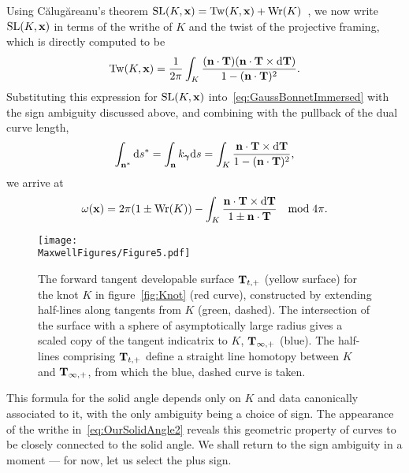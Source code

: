     Using C\u{a}lug\u{a}reanu's theorem $\mathrm{SL}(K,{\bf x}) = \mathrm{Tw}(K,{\bf x}) +\mathrm{Wr}(K)$~\citep{Calugareanu1959,Calugareanu1961}, we now write $ \mathrm{SL}(K,{\bf x})$ in terms of the writhe of $K$ and the twist of the projective framing, which is directly computed to be 
    \begin{equation}
        \mathrm{Tw}(K,{\bf x}) = \frac{1}{2\pi}\int_K  \frac{ ( {\bf n} \cdot {\bf T} ) ({\bf n} \cdot {\bf T} \times \mathrm{d}{\bf T}) }{1 - ({\bf n} \cdot {\bf T})^2} . 
        \label{eq:Twist}
    \end{equation}
    Substituting this expression for $\mathrm{SL}(K,{\bf x})$ into~\eqref{eq:GaussBonnetImmersed} with the sign ambiguity discussed above, and combining with the pullback of the dual curve length,
    \begin{equation}
        \int_{{\bf n ^*}} \mathrm{d} s^* = \int_{{\bf n}} k_{\bf \boldsymbol \gamma } \mathrm{d} s = \int_K  \frac{ {\bf n} \cdot {\bf T} \times \mathrm{d}{\bf T} }{1 - ({\bf n} \cdot {\bf T})^2},
        \label{eq:geodesicpullback1}
    \end{equation}
    we arrive at
    \begin{equation}
        \omega({\bf x}) = 2 \pi(1 \pm \mathrm{Wr}(K)) - \int_K  \frac{ {\bf n} \cdot {\bf T} \times \mathrm{d}{\bf T} }{1 \pm {\bf n} \cdot {\bf T}}  \quad \mathrm{mod}\; 4\pi .
        \label{eq:OurSolidAngle2}
    \end{equation}    
    \begin{figure}[t]
        \begin{centering}
            \texttt{[image: \\MaxwellFigures/Figure5.pdf]}
            \caption[Homotopy along the tangent developable surface.]{The forward tangent developable surface ${\bf{T}}_{t,+}$ (yellow surface) for the knot $K$ in figure~\ref{fig:Knot} (red curve), constructed by extending half-lines along tangents from $K$ (green, dashed). The intersection of the surface with a sphere of asymptotically large radius gives a scaled copy of the tangent indicatrix to $K$, ${\bf T}_{\infty,+}$ (blue). The half-lines comprising ${\bf T}_{t,+}$ define a straight line homotopy between $K$ and ${\bf T}_{\infty,+}$, from which the blue, dashed curve is taken.}
            \label{fig:TangentDevelopable}
        \end{centering}
    \end{figure}
    This formula for the solid angle depends only on $K$ and data canonically associated to it, with the only ambiguity being a choice of sign. The appearance of the writhe in~\eqref{eq:OurSolidAngle2} reveals this geometric property of curves to be closely connected to the solid angle. We shall return to the sign ambiguity in a moment --- for now, let us select the plus sign. 

